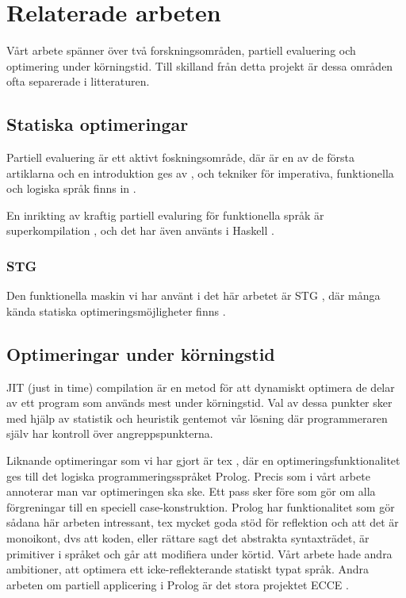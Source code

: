 \documentclass[Rapport]{subfiles}
\begin{document}
\section{Relaterade arbeten}

Vårt arbete spänner över två forskningsområden, partiell evaluering
och optimering under körningstid. Till skilland från detta projekt 
är dessa områden ofta separerade i litteraturen.

\subsection{Statiska optimeringar}

Partiell evaluering är ett aktivt foskningsområde, där 
\cite{futamura1999partial} är en av de första artiklarna
och en introduktion ges av \cite{intropap}, och
tekniker för imperativa, funktionella och logiska språk
finns in \cite{jones1993partial}.

En inrikting av kraftig partiell evaluring för 
funktionella språk är superkompilation \cite{srensen1995algorithm}
, och det har även använts i Haskell \cite{mitchell2007supercompiler}.

\subsubsection{STG}

Den funktionella maskin vi har använt i det här arbetet är 
STG \cite{stg}, där många kända statiska optimeringsmöjligheter 
finns \cite{santos}.

\subsection{Optimeringar under körningstid}

JIT (just in time) compilation är en metod för att dynamiskt optimera
de delar av ett program som används mest under körningstid. Val av
dessa punkter sker med hjälp av statistik och heuristik gentemot vår
lösning där programmeraren själv har kontroll över angreppspunkterna. 

Liknande optimeringar som vi har gjort är tex \cite{bolz-automatic},
där en optimeringsfunktionalitet ges till det logiska programmeringsspråket
Prolog. Precis som i vårt arbete annoterar man var optimeringen ska ske.
Ett pass sker före som gör om alla förgreningar till en speciell 
case-konstruktion. Prolog har funktionalitet som gör sådana här arbeten
intressant, tex mycket goda stöd för reflektion och att det är 
monoikont, dvs att koden, eller rättare sagt det abstrakta syntaxträdet,
är primitiver i språket och går att modifiera under körtid. Vårt arbete
hade andra ambitioner, att optimera ett icke-reflekterande statiskt typat
språk. Andra arbeten om partiell applicering i Prolog är det stora
projektet ECCE \cite{ecce}.
\end{document}
